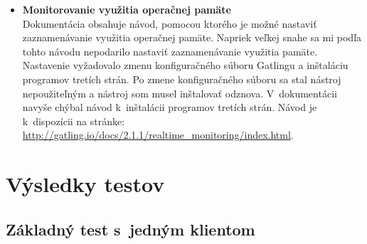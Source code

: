\documentclass[12pt,oneside,final]{fithesis-utf8}
\begin{document}
\begin{itemize}

\item \textbf{Monitorovanie využitia operačnej pamäte}\\
Dokumentácia obsahuje návod, pomocou ktorého je možné nastaviť zaznamenávanie využitia operačnej pamäte. Napriek veľkej snahe sa mi podľa tohto návodu nepodarilo nastaviť zaznamenávanie využitia pamäte. Nastavenie vyžadovalo zmenu konfiguračného súboru Gatlingu a inštaláciu programov tretích strán. Po zmene konfiguračného súboru sa stal nástroj nepoužiteľným a nástroj som musel inštalovať odznova. V~dokumentácii navyše chýbal návod k~inštalácii programov tretích strán. Návod je k~dispozícii na stránke: \url{http://gatling.io/docs/2.1.1/realtime_monitoring/index.html}.

\end{itemize}

\section{Výsledky testov}

\subsection{Základný test s~jedným klientom}
\end{document}
